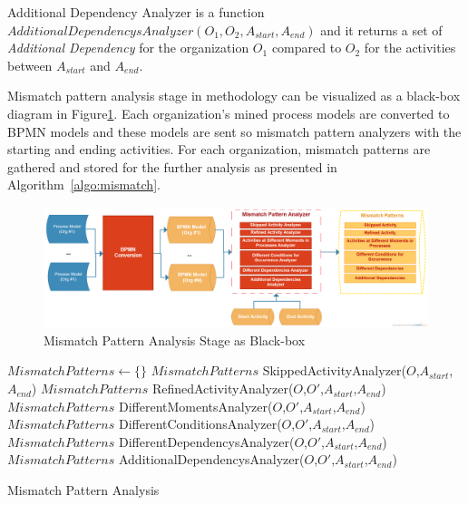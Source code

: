 \begin{description}
		\begin{definition}
		Additional Dependency Analyzer is a function 
		$AdditionalDependencysAnalyzer(O_{1}, O_{2}, A_{start}, A_{end})$ and it returns a set of \textit{Additional Dependency} for the organization $O_{1}$ compared to $O_{2}$ for the activities between $A_{start}$ and $A_{end}$.
		\end{definition}	
 \end{description}
 
Mismatch pattern analysis stage in methodology can be visualized as a black-box diagram in Figure\ref{fig:mismatch-pattern-analysis-blackbox}. Each organization's mined process models are converted to BPMN models and these models are sent so mismatch pattern analyzers with the starting and ending activities. For each organization, mismatch patterns are gathered and stored for the further analysis as presented in Algorithm~\ref{algo:mismatch}.
\begin{figure}
  \centering
  \includegraphics[width=\textwidth]{4_methodology/mismatch-pattern-analysis-blackbox}
  \caption{Mismatch Pattern Analysis Stage as Black-box}
  \label{fig:mismatch-pattern-analysis-blackbox}
\end{figure}

\begin{algorithm}
\DontPrintSemicolon %
$MismatchPatterns \leftarrow \{\}$ \;
$MismatchPatterns$ \leftarrow  SkippedActivityAnalyzer($O$,$A_{start}$,$A_{end}$) \;
$MismatchPatterns$ \leftarrow  RefinedActivityAnalyzer($O$,$O'$,$A_{start}$,$A_{end}$) \;
$MismatchPatterns$ \leftarrow  DifferentMomentsAnalyzer($O$,$O'$,$A_{start}$,$A_{end}$) \;
$MismatchPatterns$ \leftarrow  DifferentConditionsAnalyzer($O$,$O'$,$A_{start}$,$A_{end}$) \;
$MismatchPatterns$ \leftarrow  DifferentDependencysAnalyzer($O$,$O'$,$A_{start}$,$A_{end}$) \;
$MismatchPatterns$ \leftarrow  AdditionalDependencysAnalyzer($O$,$O'$,$A_{start}$,$A_{end}$) \;
\;
\caption{Mismatch Pattern Analysis}
\label{algo:mismatch}
\end{algorithm}


